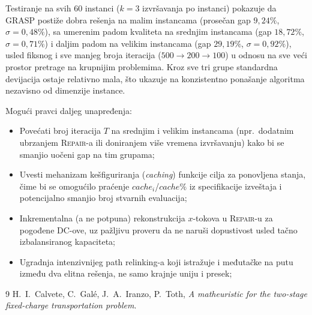 \documentclass[12pt,a4paper]{article}
\begin{document}
Testiranje na svih $60$ instanci ($k=3$ izvršavanja po instanci) pokazuje
da GRASP postiže dobra rešenja na malim instancama (prosečan gap
$9{,}24\%$, $\sigma=0{,}48\%$), sa umerenim padom kvaliteta na srednjim
instancama (gap $18{,}72\%$, $\sigma=0{,}71\%$) i daljim padom na velikim
instancama (gap $29{,}19\%$, $\sigma=0{,}92\%$), usled fiksnog i sve manjeg
broja iteracija ($500\to200\to100$) u odnosu na sve veći prostor pretrage
na krupnijim problemima. Kroz sve tri grupe standardna devijacija ostaje
relativno mala, što ukazuje na konzistentno ponašanje algoritma nezavisno
od dimenzije instance.

Mogući pravci daljeg unapređenja:
\begin{itemize}
  \item Povećati broj iteracija $T$ na srednjim i velikim instancama (npr.\
    dodatnim ubrzanjem \textsc{Repair}-a ili doniranjem više vremena
    izvršavanju) kako bi se smanjio uočeni gap na tim grupama;
  \item Uvesti mehanizam kešfiguriranja (\textit{caching}) funkcije cilja
    za ponovljena stanja, čime bi se omogućilo praćenje $cache_i$/$cache\%$
    iz specifikacije izveštaja i potencijalno smanjio broj stvarnih
    evaluacija;
  \item Inkrementalna (a ne potpuna) rekonstrukcija $x$-tokova u
    \textsc{Repair}-u za pogođene DC-ove, uz pažljivu proveru da ne naruši
    dopustivost usled tačno izbalansiranog kapaciteta;
  \item Ugradnja intenzivnijeg path relinking-a koji istražuje i
    međutačke na putu između dva elitna rešenja, ne samo krajnje uniju i
    presek;
\end{itemize}

\begin{thebibliography}{9}
H.~I.~Calvete, C.~Gal\'e, J.~A.~Iranzo, P.~Toth,
\textit{A matheuristic for the two-stage fixed-charge transportation problem}.
\end{thebibliography}
\end{document}
